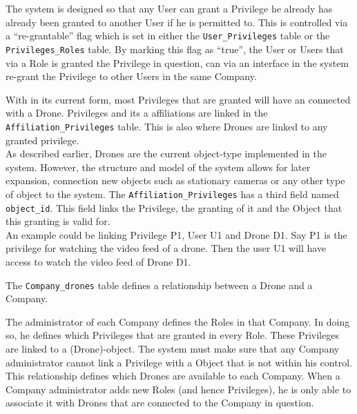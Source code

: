 The system is designed so that any User can grant a Privilege he already has already been granted to another User if he is permitted to.
This is controlled via a ``re-grantable'' flag which is set in either the \verb+User_Privileges+ table or the \verb+Privileges_Roles+ table.
By marking this flag as ``true'', the User or Users that via a Role is granted the Privilege in question, can via an interface in the system re-grant the Privilege to other Users in the same Company.




With \projectname{} in its current form, most Privileges that are granted will have an connected with a Drone.
Privileges and its a affiliations are linked in the \verb+Affiliation_Privileges+ table.
This is also where Drones are linked to any granted privilege. \\

As described earlier, Drones are the current object-type implemented in the system.
However, the structure and model of the system allows for later expansion, connection new objects such as stationary cameras or any other type of object to the system.
The \verb+Affiliation_Privileges+ has a third field named \verb+object_id+.
This field links the Privilege, the granting of it and the Object that this granting is valid for. \\

An example could be linking Privilege P1, User U1 and Drone D1.
Say P1 is the privilege for watching the video feed of a drone.
Then the user U1 will have access to watch the video feed of Drone D1.


The \verb+Company_drones+ table defines a relationship between a Drone and a Company.

The administrator of each Company defines the Roles in that Company.
In doing so, he defines which Privileges that are granted in every Role.
These Privileges are linked to a (Drone)-object.
The system must make sure that any Company administrator cannot link a Privilege with a Object that is not within his control. \\

This relationship defines which Drones are available to each Company.
When a Company administrator adds new Roles (and hence Privileges), he is only able to associate it with Drones that are connected to the Company in question.
